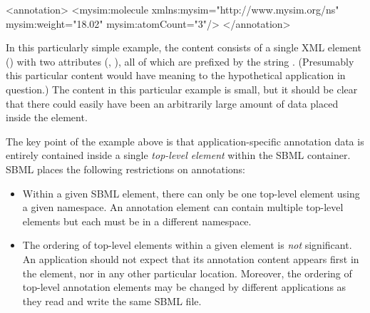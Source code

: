 \begin{example}
<annotation>
    <mysim:molecule xmlns:mysim="http://www.mysim.org/ns"
         mysim:weight="18.02" mysim:atomCount="3"/>
</annotation>
\end{example}

In this particularly simple example, the content consists of a single
XML element () with two attributes
(, ), all of which are prefixed by
the string .  (Presumably this particular content
would have meaning to the hypothetical application in question.)
The content in this particular example is small, but it should be
clear that there could easily have been an arbitrarily large
amount of data placed inside the  element.

The key point of the example above is that application-specific
annotation data is entirely contained inside a single
\emph{top-level element} within the SBML 
container.  SBML \thisLVnum places the following
restrictions on annotations:
\begin{itemize}

\item Within a given SBML  element, there can
  only be one top-level element using a given namespace.  An
  annotation element can contain multiple top-level elements but
  each must be in a different namespace.

  
\item The ordering of top-level elements within a given
   element is \emph{not} significant.  An
  application should not expect that its annotation content
  appears first in the  element, nor in any
  other particular location.  Moreover, the ordering of
    top-level annotation elements may be changed by
  different applications as they read and write the same
    SBML file.

\end{itemize}

